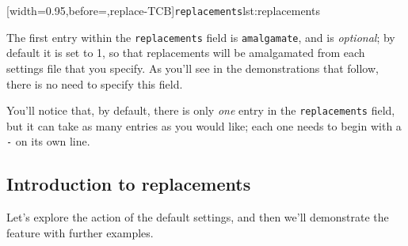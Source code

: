  [width=0.95\linewidth,before=\centering,replace-TCB]{\texttt{replacements}}{lst:replacements}

 The first entry within the \texttt{replacements} field is \texttt{amalgamate}, and is
 \emph{optional}; by default it is set to 1, so that replacements will be amalgamated from
 each settings file that you specify. As you'll see in the demonstrations that follow,
 there is no need to specify this field.

 You'll notice that, by default, there is only \emph{one} entry in the
 \texttt{replacements} field, but it can take as many entries as you would like; each one
 needs to begin with a \texttt{-} on its own line.

\subsection{Introduction to replacements}
 Let's explore the action of the default settings, and then we'll demonstrate the feature
 with further examples. 

